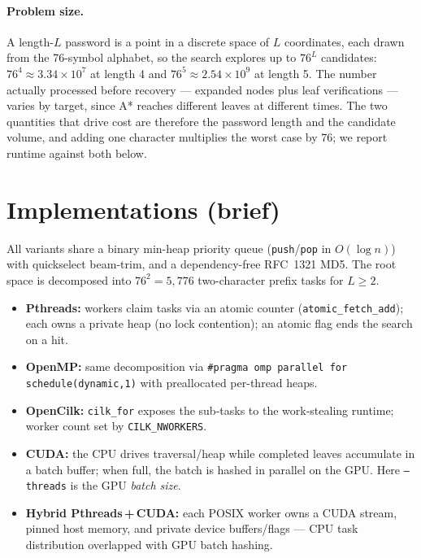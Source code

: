 \documentclass[11pt,a4paper]{article}
\begin{document}
\paragraph{Problem size.}
A length-$L$ password is a point in a discrete space of $L$ coordinates, each drawn from the
76-symbol alphabet, so the search explores up to $76^{L}$ candidates: $76^{4}\approx3.34\times10^{7}$
at length 4 and $76^{5}\approx2.54\times10^{9}$ at length 5. The number actually processed before
recovery --- expanded nodes plus leaf verifications --- varies by target, since A* reaches different
leaves at different times. The two quantities that drive cost are therefore the password length and
the candidate volume, and adding one character multiplies the worst case by 76; we report runtime
against both below.

\section{Implementations (brief)}
All variants share a binary min-heap priority queue (\texttt{push}/\texttt{pop} in $O(\log n)$) with
quickselect beam-trim, and a dependency-free RFC~1321 MD5. The root space is decomposed into
$76^{2}=5{,}776$ two-character prefix tasks for $L\ge2$.
\begin{itemize}
  \item \textbf{Pthreads:} workers claim tasks via an atomic counter (\texttt{atomic\_fetch\_add});
        each owns a private heap (no lock contention); an atomic flag ends the search on a hit.
  \item \textbf{OpenMP:} same decomposition via \texttt{\#pragma omp parallel for schedule(dynamic,1)}
        with preallocated per-thread heaps.
  \item \textbf{OpenCilk:} \texttt{cilk\_for} exposes the sub-tasks to the work-stealing runtime;
        worker count set by \texttt{CILK\_NWORKERS}.
  \item \textbf{CUDA:} the CPU drives traversal/heap while completed leaves accumulate in a batch
        buffer; when full, the batch is hashed in parallel on the GPU. Here \texttt{--threads} is the
        GPU \emph{batch size}.
  \item \textbf{Hybrid Pthreads\,+\,CUDA:} each POSIX worker owns a CUDA stream, pinned host memory,
        and private device buffers/flags --- CPU task distribution overlapped with GPU batch hashing.
\end{itemize}
\end{document}

